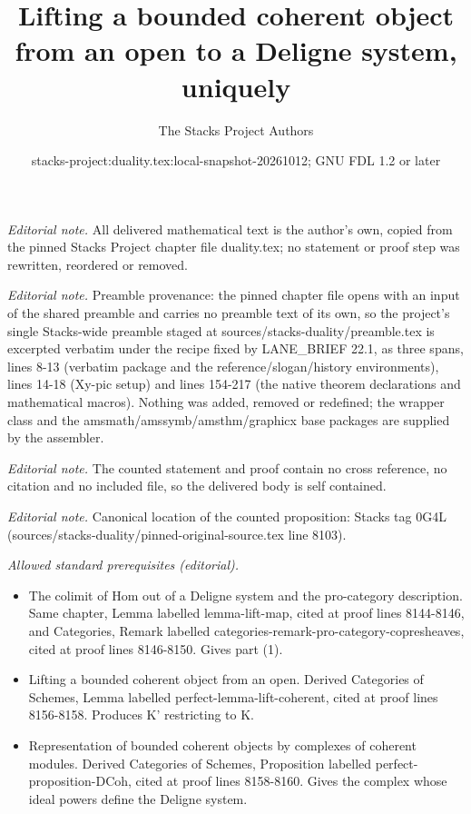 \documentclass[10pt,a4paper]{amsart}
\title{Lifting a bounded coherent object from an open to a Deligne system, uniquely}
\author{The Stacks Project Authors}
\date{stacks-project:duality.tex:local-snapshot-20261012; GNU FDL 1.2 or later}
\theoremstyle{plain}
\theoremstyle{definition}
\theoremstyle{remark}
\numberwithin{equation}{subsection}
\begin{document}
\maketitle
\noindent\textit{Editorial note.} All delivered mathematical text is the author's own, copied from the pinned Stacks Project chapter file duality.tex; no statement or proof step was rewritten, reordered or removed.\par\medskip
\noindent\textit{Editorial note.} Preamble provenance: the pinned chapter file opens with an input of the shared preamble and carries no preamble text of its own, so the project's single Stacks-wide preamble staged at sources/stacks-duality/preamble.tex is excerpted verbatim under the recipe fixed by LANE\_BRIEF 22.1, as three spans, lines 8-13 (verbatim package and the reference/slogan/history environments), lines 14-18 (Xy-pic setup) and lines 154-217 (the native theorem declarations and mathematical macros). Nothing was added, removed or redefined; the wrapper class and the amsmath/amssymb/amsthm/graphicx base packages are supplied by the assembler.\par\medskip
\noindent\textit{Editorial note.} The counted statement and proof contain no cross reference, no citation and no included file, so the delivered body is self contained.\par\medskip
\noindent\textit{Editorial note.} Canonical location of the counted proposition: Stacks tag 0G4L (sources/stacks-duality/pinned-original-source.tex line 8103).\par\medskip
\noindent\textit{Allowed standard prerequisites (editorial).}\begin{itemize}
\item The colimit of Hom out of a Deligne system and the pro-category description. Same chapter, Lemma labelled lemma-lift-map, cited at proof lines 8144-8146, and Categories, Remark labelled categories-remark-pro-category-copresheaves, cited at proof lines 8146-8150. Gives part (1).
\item Lifting a bounded coherent object from an open. Derived Categories of Schemes, Lemma labelled perfect-lemma-lift-coherent, cited at proof lines 8156-8158. Produces K' restricting to K.
\item Representation of bounded coherent objects by complexes of coherent modules. Derived Categories of Schemes, Proposition labelled perfect-proposition-DCoh, cited at proof lines 8158-8160. Gives the complex whose ideal powers define the Deligne system.
\end{itemize}\medskip
\end{document}

